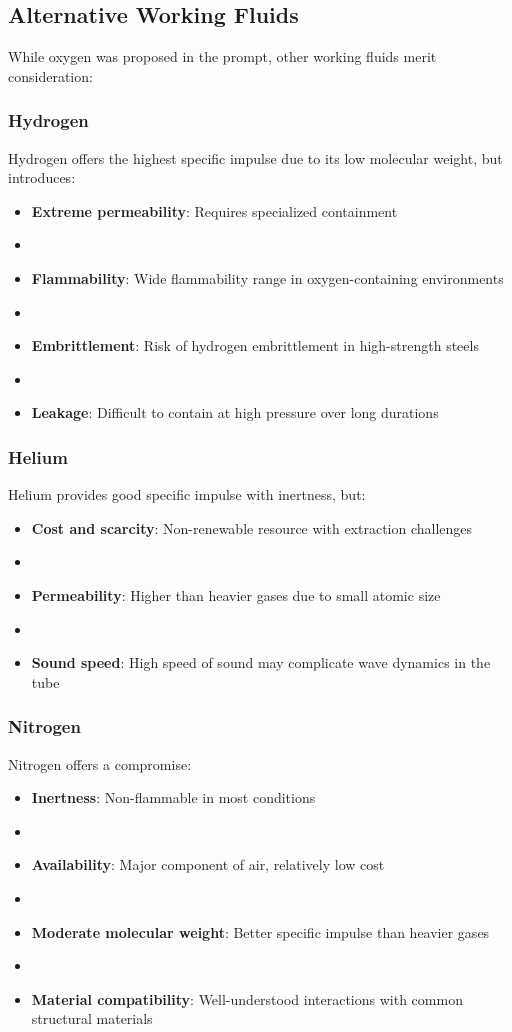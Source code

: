 \documentclass[12pt]{article}
\begin{document}
\subsection{Alternative Working Fluids}
While oxygen was proposed in the prompt, other working fluids merit consideration:

\subsubsection{Hydrogen}
Hydrogen offers the highest specific impulse due to its low molecular weight, but introduces:
\begin{itemize}
    \item \textbf{Extreme permeability}: Requires specialized containment
    \item \item \textbf{Flammability}: Wide flammability range in oxygen-containing environments
    \item \item \textbf{Embrittlement}: Risk of hydrogen embrittlement in high-strength steels
    \item \item \textbf{Leakage}: Difficult to contain at high pressure over long durations
\end{itemize}

\subsubsection{Helium}
Helium provides good specific impulse with inertness, but:
\begin{itemize}
    \item \textbf{Cost and scarcity}: Non-renewable resource with extraction challenges
    \item \item \textbf{Permeability}: Higher than heavier gases due to small atomic size
    \item \item \textbf{Sound speed}: High speed of sound may complicate wave dynamics in the tube
\end{itemize}

\subsubsection{Nitrogen}
Nitrogen offers a compromise:
\begin{itemize}
    \item \textbf{Inertness}: Non-flammable in most conditions
    \item \item \textbf{Availability}: Major component of air, relatively low cost
    \item \item \textbf{Moderate molecular weight}: Better specific impulse than heavier gases
    \item \item \textbf{Material compatibility}: Well-understood interactions with common structural materials
\end{itemize}
\end{document}
